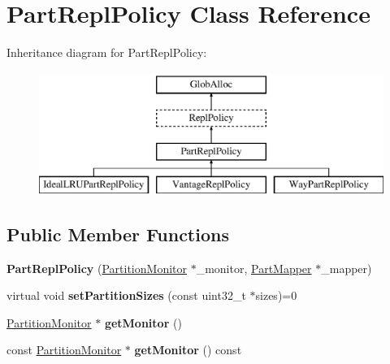 \hypertarget{classPartReplPolicy}{\section{Part\-Repl\-Policy Class Reference}
\label{classPartReplPolicy}
}
Inheritance diagram for Part\-Repl\-Policy\-:\begin{figure}[H]
\begin{center}
\leavevmode
\includegraphics[height=4.000000cm]{classPartReplPolicy}
\end{center}
\end{figure}
\subsection*{Public Member Functions}
\begin{DoxyCompactItemize}
\item 
\hypertarget{classPartReplPolicy_a29b297f5d795c312e054990c57a517ae}{{\bfseries Part\-Repl\-Policy} (\hyperlink{classPartitionMonitor}{Partition\-Monitor} $\ast$\-\_\-monitor, \hyperlink{classPartMapper}{Part\-Mapper} $\ast$\-\_\-mapper)}\label{classPartReplPolicy_a29b297f5d795c312e054990c57a517ae}

\item 
\hypertarget{classPartReplPolicy_a7b69f8f5aa34b66c6ab3ee11a99996e2}{virtual void {\bfseries set\-Partition\-Sizes} (const uint32\-\_\-t $\ast$sizes)=0}\label{classPartReplPolicy_a7b69f8f5aa34b66c6ab3ee11a99996e2}

\item 
\hypertarget{classPartReplPolicy_a95734ae50d3e9d6a54aef7a5103082db}{\hyperlink{classPartitionMonitor}{Partition\-Monitor} $\ast$ {\bfseries get\-Monitor} ()}\label{classPartReplPolicy_a95734ae50d3e9d6a54aef7a5103082db}

\item 
\hypertarget{classPartReplPolicy_a670febef035e87e5720c2011dcb48058}{const \hyperlink{classPartitionMonitor}{Partition\-Monitor} $\ast$ {\bfseries get\-Monitor} () const }\label{classPartReplPolicy_a670febef035e87e5720c2011dcb48058}

\end{DoxyCompactItemize}
